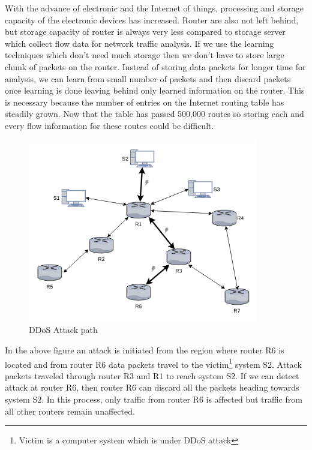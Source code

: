 \documentclass[10pt,oneside,a4paper]{article}
\begin{document}
With the advance of electronic and the Internet of things, processing and storage capacity of the electronic devices has increased. Router are also not left behind, but storage capacity of router is always very less compared to storage server which collect flow data for network traffic analysis. If we use the learning techniques which don't need much storage then we don't have to store large chunk of packets on the router. Instead of storing data packets for longer time for analysis, we can learn from small number of packets and then discard packets once learning is done leaving behind only learned information on the router. This is necessary because the number of entries on the Internet routing table has steadily grown. Now that the table has passed 500,000 routes\cite{routingtablesize} so storing each and every flow information for these routes could be difficult.\par

\begin{figure}[H]
\centering
\includegraphics[width=0.90\textwidth]{RouterCommunication}
\caption{DDoS Attack path} \label{fig:attackpath}
\end{figure}


In the above figure an attack is initiated from the region where router R6 is located and from router R6 data packets travel to the victim\footnote{Victim is a computer system which is under DDoS attack} system S2. Attack packets traveled through router R3 and R1 to reach system S2. If we can detect attack at router R6, then router R6 can discard all the packets heading towards system S2. In this process, only traffic from router R6 is affected but traffic from all other routers remain unaffected.
\end{document}
